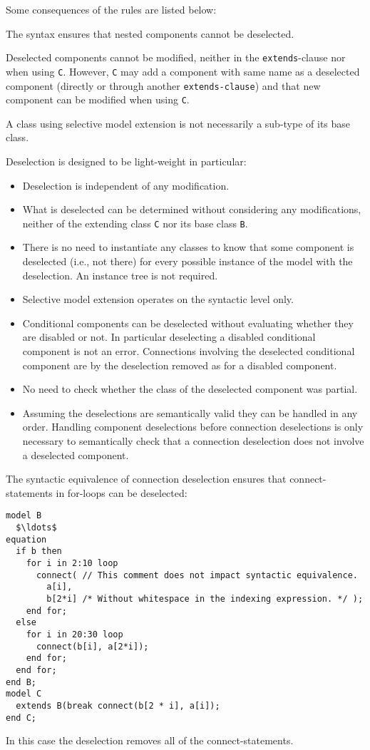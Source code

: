 \begin{nonnormative}
Some consequences of the rules are listed below:

The syntax ensures that nested components cannot be deselected.

Deselected components cannot be modified, neither in the \lstinline!extends!-clause nor when using \lstinline!C!.
However, \lstinline!C! may add a component with same name as a deselected component (directly or through another \lstinline!extends-clause!) and that new component can be modified when using \lstinline!C!.

A class using selective model extension is not necessarily a sub-type of its base class.

Deselection is designed to be light-weight in particular:
\begin{itemize}
\item Deselection is independent of any modification.
\item What is deselected can be determined without considering any modifications, neither of the extending class \lstinline!C! nor its base class \lstinline!B!.
\item There is no need to instantiate any classes to know that some component is deselected (i.e., not there) for every possible instance of the model with the deselection.
An instance tree is not required.
\item Selective model extension operates on the syntactic level only.
\item Conditional components can be deselected without evaluating whether they are disabled or not.
In particular deselecting a disabled conditional component is not an error.
Connections involving the deselected conditional component are by the deselection removed as for a disabled component.
\item No need to check whether the class of the deselected component was partial.
\item Assuming the deselections are semantically valid they can be handled in any order.
Handling component deselections before connection deselections is only necessary to semantically check that a connection deselection does not involve a deselected component.
\end{itemize}

\begin{example}
The syntactic equivalence of connection deselection ensures that connect-statements in for-loops can be deselected:
\begin{lstlisting}[language=modelica]
model B
  $\ldots$
equation
  if b then
    for i in 2:10 loop
      connect( // This comment does not impact syntactic equivalence.
        a[i],
        b[2*i] /* Without whitespace in the indexing expression. */ );
    end for;
  else
    for i in 20:30 loop
      connect(b[i], a[2*i]);
    end for;
  end for;
end B;
model C
  extends B(break connect(b[2 * i], a[i]);
end C;
\end{lstlisting}
In this case the deselection removes all of the connect-statements.
\end{example}
\end{nonnormative}
